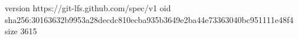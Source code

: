 version https://git-lfs.github.com/spec/v1
oid sha256:30163632b9953a28decdc810ecba935b3649e2ba44e73363040bc951111e48f4
size 3615
